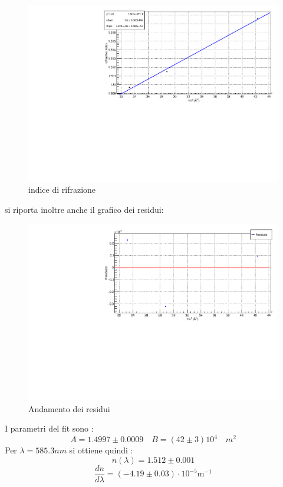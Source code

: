 \documentclass{article}
\begin{document}
\begin{center}
	\begin{figure}[ht]
		\centering
		\includegraphics[scale=0.28, angle=0]{nFit.pdf}
		\caption{ indice di rifrazione}
		\label{fig:nFit}
	\end{figure}
\end{center}

si riporta inoltre anche il grafico dei residui:
\begin{center}
	\begin{figure}[ht]
		\centering
		\includegraphics[scale=0.28, angle=0]{nFitRes.pdf}
		\caption{ Andamento dei residui}
		\label{fig:nFitRes}
	\end{figure}
\end{center}

	I parametri del fit sono :
	$$ A= 1.4997 \pm 0.0009 \quad B= (42 \pm 3 )10^4 \quad m^2$$
	Per $\lambda= 585.3 nm$ si ottiene quindi :
	$$n(\lambda)= 1.512 \pm 0.001  $$
	$$  \frac{dn}{d\lambda} = (-4.19 \pm 0.03 )\cdot 10^{-5} \text{m}^{-1}$$
\end{document}
